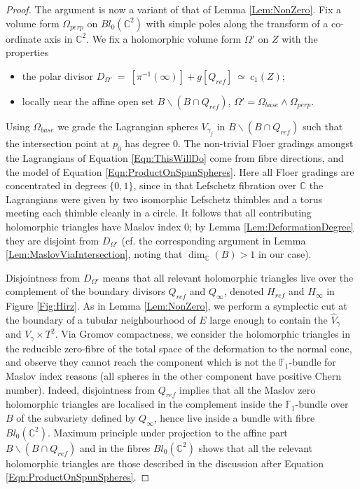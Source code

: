 \documentclass[reqno,10pt]{amsart}
\numberwithin{equation}{section}
\newcommand{\bC}{{\mathbb C}}
\newcommand{\bF}{{\mathbb F}}
\theoremstyle{remark}
\begin{document}
\begin{proof}
The argument is now a variant of that of Lemma \ref{Lem:NonZero}.  Fix a volume form $\Omega_{perp}$ on $Bl_0(\bC^2)$ with simple poles along the transform of a co-ordinate axis in $\bC^2$.  We fix a holomorphic volume form $\Omega'$ on $Z$ with the properties
\begin{itemize}
\item the polar divisor $D_{\Omega'} \ = \ [\pi^{-1}(\infty)] + g [Q_{ref}] \ \simeq \ c_1(Z)$; 
\item locally near  the affine open set $B\backslash (B \cap Q_{ref})$, $\Omega' = \Omega_{base} \wedge \Omega_{perp}$.
\end{itemize}
Using $\Omega_{base}$ we grade the Lagrangian spheres $V_{\gamma_j}$ in $B \backslash (B \cap Q_{ref})$ such that the intersection point at $p_0$ has degree $0$.  The non-trivial Floer gradings amongst the Lagrangians of Equation \ref{Eqn:ThisWillDo} come from fibre directions, and the model of Equation \ref{Eqn:ProductOnSpunSpheres}. Here all Floer gradings are concentrated in degrees $\{0,1\}$, since in that Lefschetz fibration over $\bC$ the Lagrangians were given by two isomorphic Lefschetz thimbles and a torus meeting each thimble cleanly in a circle.  It follows that all contributing holomorphic triangles have Maslov index $0$; by Lemma \ref{Lem:DeformationDegree} they are disjoint from $D_{\Omega'}$ (cf. the corresponding argument in Lemma \ref{Lem:MaslovViaIntersection}, noting that $\dim_{\bC}(B)>1$ in our case).  

Disjointness from $D_{\Omega'}$ means that all relevant holomorphic triangles live over the complement of the boundary divisors $Q_{ref}$ and $Q_{\infty}$, denoted $H_{ref}$ and $H_{\infty}$ in Figure \ref{Fig:Hirz}.  As in Lemma \ref{Lem:NonZero}, we perform a symplectic cut at the boundary of a tubular neighbourhood of $E$ large enough to contain the $\hat{V}_{\gamma}$ and $V_{\gamma} \times T^2$.  Via Gromov compactness, we consider the holomorphic triangles in the reducible zero-fibre of the total space of the deformation to the normal cone, and observe they cannot reach the component which is not the $\bF_1$-bundle for Maslov index reasons (all spheres in the other component have positive Chern number).   Indeed, disjointness from $Q_{ref}$ implies that all the Maslov zero holomorphic triangles are localised in the complement inside the $\bF_1$-bundle over $B$ of the subvariety defined by $Q_{\infty}$, hence  live inside a bundle with fibre $Bl_0(\bC^2)$.  Maximum principle under projection to the affine part $B\backslash (B\cap Q_{ref})$ and in the fibres $Bl_0(\bC^2)$  shows that all the relevant holomorphic triangles are those described in the discussion after Equation \ref{Eqn:ProductOnSpunSpheres}.
 \end{proof}
 
\end{document}
